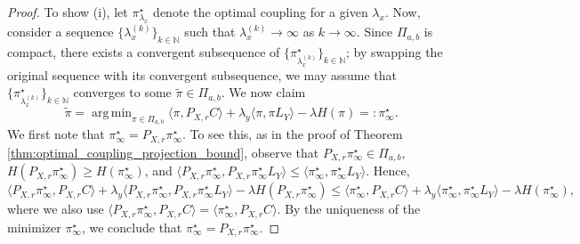 \documentclass[10pt,a4paper]{amsart}
\DeclareMathOperator*{\argmin}{arg\,min}
\begin{document}
\begin{proof}
    To show (i), let $\pi^\star_{\lambda_x}$ denote the optimal coupling for a given $\lambda_x$. Now, consider a sequence $\{\lambda_x^{(k)}\}_{k \in \mathbb{N}}$ such that $\lambda_x^{(k)} \to \infty$ as $k \to \infty$. Since $\Pi_{a, b}$ is compact, there exists a convergent subsequence of $\{\pi^\star_{\lambda_x^{(k)}}\}_{k \in \mathbb{N}}$; by swapping the original sequence with its convergent subsequence, we may assume that $\{\pi^\star_{\lambda_x^{(k)}}\}_{k \in \mathbb{N}}$ converges to some $\tilde{\pi} \in \Pi_{a, b}$. We now claim 
    \begin{equation*}
        \tilde{\pi} = \argmin_{\pi \in \Pi_{a, b}} \langle \pi, P_{X, r} C \rangle + \lambda_y \langle \pi, \pi L_Y \rangle - \lambda H(\pi) =: \pi^\star_\infty.
    \end{equation*}
    We first note that $\pi^\star_\infty = P_{X, r} \pi^\star_\infty$. To see this, as in the proof of Theorem \ref{thm:optimal_coupling_projection_bound}, observe that $P_{X, r} \pi^\star_\infty \in \Pi_{a, b}$, $H(P_{X, r} \pi^\star_\infty) \ge H(\pi^\star_\infty)$, and $\langle P_{X, r} \pi^\star_\infty, P_{X, r} \pi^\star_\infty L_Y \rangle \le \langle \pi^\star_\infty, \pi^\star_\infty L_Y \rangle$. Hence,
    \begin{equation*}
        \langle P_{X, r} \pi^\star_\infty, P_{X, r} C \rangle + \lambda_y \langle P_{X, r} \pi^\star_\infty, P_{X, r} \pi^\star_\infty L_Y \rangle - \lambda H(P_{X, r} \pi^\star_\infty) \le \langle \pi^\star_\infty, P_{X, r} C \rangle + \lambda_y \langle \pi^\star_\infty, \pi^\star_\infty L_Y \rangle - \lambda H(\pi^\star_\infty),
    \end{equation*}
    where we also use $\langle P_{X, r} \pi^\star_\infty, P_{X, r} C \rangle = \langle \pi^\star_\infty, P_{X, r} C \rangle$. By the uniqueness of the minimizer $\pi^\star_\infty$, we conclude that $\pi^\star_\infty = P_{X, r} \pi^\star_\infty$.



\end{proof}
\end{document}
